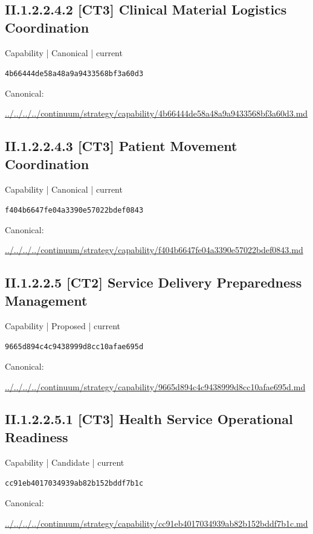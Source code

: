 \documentclass[10pt,a4paper]{article}
\begin{document}
\subsection*{II.1.2.2.4.2 [CT3] Clinical Material Logistics Coordination}
{\small Capability | Canonical | current}\par
\texttt{4b66444de58a48a9a9433568bf3a60d3}\par
Canonical: \par
{\footnotesize\url{../../../../continuum/strategy/capability/4b66444de58a48a9a9433568bf3a60d3.md}}\par
\subsection*{II.1.2.2.4.3 [CT3] Patient Movement Coordination}
{\small Capability | Canonical | current}\par
\texttt{f404b6647fe04a3390e57022bdef0843}\par
Canonical: \par
{\footnotesize\url{../../../../continuum/strategy/capability/f404b6647fe04a3390e57022bdef0843.md}}\par
\subsection*{II.1.2.2.5 [CT2] Service Delivery Preparedness Management}
{\small Capability | Proposed | current}\par
\texttt{9665d894c4c9438999d8cc10afae695d}\par
Canonical: \par
{\footnotesize\url{../../../../continuum/strategy/capability/9665d894c4c9438999d8cc10afae695d.md}}\par
\subsection*{II.1.2.2.5.1 [CT3] Health Service Operational Readiness}
{\small Capability | Candidate | current}\par
\texttt{cc91eb4017034939ab82b152bddf7b1c}\par
Canonical: \par
{\footnotesize\url{../../../../continuum/strategy/capability/cc91eb4017034939ab82b152bddf7b1c.md}}\par
\end{document}
